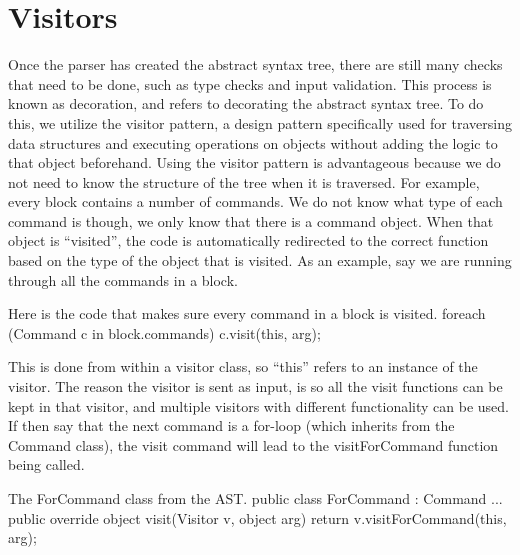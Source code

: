 \section{Visitors}
Once the parser has created the abstract syntax tree, there are still many checks that need to be done, such as type checks and input validation. 
This process is known as decoration, and refers to decorating the abstract syntax tree. \newline
To do this, we utilize the visitor pattern, a design pattern specifically used for traversing data structures and executing operations on objects without adding the logic to that object beforehand. \newline
Using the visitor pattern is advantageous because we do not need to know the structure of the tree when it is traversed.
For example, every block contains a number of commands. 
We do not know what type of each command is though, we only know that there is a command object. 
When that object is "`visited"', the code is automatically redirected to the correct function based on the type of the object that is visited. \newline\newline
As an example, say we are running through all the commands in a block.
\newline
\begin{source}{Here is the code that makes sure every command in a block is visited.}{}
foreach (Command c in block.commands)
  {
		c.visit(this, arg);
	}
\end{source}

This is done from within a visitor class, so "`this"' refers to an instance of the visitor. 
The reason the visitor is sent as input, is so all the visit functions can be kept in that visitor, and multiple visitors with different functionality can be used.
If then say that the next command is a for-loop (which inherits from the Command class), the visit command will lead to the visitForCommand function being called.

\begin{source}{The ForCommand class from the AST.}{}
public class ForCommand : Command
    {
        ...
        public override object visit(Visitor v, object arg)
        {
            return v.visitForCommand(this, arg);
        }
    }
\end{source}

